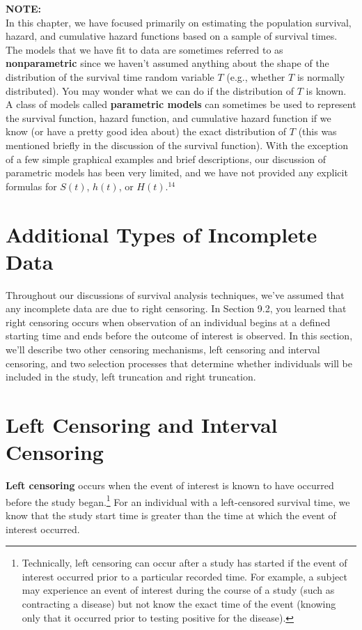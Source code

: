 \documentclass[
]{report}
\begin{document}
\large

\textbf{NOTE:}\\
In this chapter, we have focused primarily on estimating the population survival, hazard, and cumulative hazard functions based on a sample of survival times. The models that we have fit to data are sometimes referred to as \textbf{nonparametric} since we haven't assumed anything about the shape of the distribution of the survival time random variable \(T\) (e.g., whether \(T\) is normally distributed). You may wonder what we can do if the distribution of \(T\) is known. A class of models called \textbf{parametric models} can sometimes be used to represent the survival function, hazard function, and cumulative hazard function if we know (or have a pretty good idea about) the exact distribution of \(T\) (this was mentioned briefly in the discussion of the survival function). With the exception of a few simple graphical examples and brief descriptions, our discussion of parametric models has been very limited, and we have not provided any explicit formulas for \(S(t)\), \(h(t)\), or \(H(t)\).\(^{14}\)\\
\normalsize

\section{\texorpdfstring{\textbf{Additional Types of Incomplete Data}}{Additional Types of Incomplete Data}}\label{additional-types-of-incomplete-data}

Throughout our discussions of survival analysis techniques, we've assumed that any incomplete data are due to right censoring. In Section 9.2, you learned that right censoring occurs when observation of an individual begins at a defined starting time and ends before the outcome of interest is observed. In this section, we'll describe two other censoring mechanisms, left censoring and interval censoring, and two selection processes that determine whether individuals will be included in the study, left truncation and right truncation.

\section*{Left Censoring and Interval Censoring}\label{left-censoring-and-interval-censoring}

\textbf{Left censoring} occurs when the event of interest is known to have occurred before the study began.\footnote{Technically, left censoring can occur after a study has started if the event of interest occurred prior to a particular recorded time. For example, a subject may experience an event of interest during the course of a study (such as contracting a disease) but not know the exact time of the event (knowing only that it occurred prior to testing positive for the disease).} For an individual with a left-censored survival time, we know that the study start time is greater than the time at which the event of interest occurred.
\end{document}
